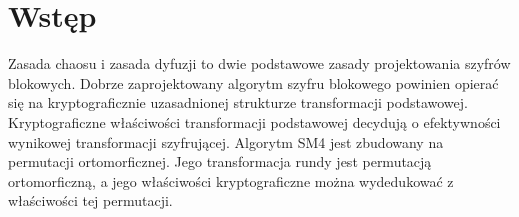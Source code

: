 \newpage
\section{Wstęp}

Zasada chaosu i zasada dyfuzji to dwie podstawowe zasady projektowania szyfrów blokowych. Dobrze zaprojektowany algorytm szyfru blokowego powinien opierać się na kryptograficznie uzasadnionej strukturze transformacji podstawowej.
Kryptograficzne właściwości transformacji podstawowej decydują o efektywności wynikowej transformacji szyfrującej.
Algorytm SM4 jest zbudowany na permutacji ortomorficznej. Jego transformacja rundy jest permutacją ortomorficzną, a jego właściwości kryptograficzne można wydedukować z właściwości tej permutacji.